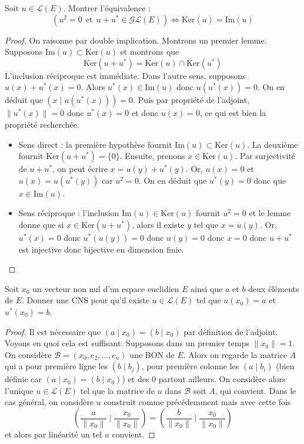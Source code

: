 \documentclass[french,a4paper]{article}
\newcommand{\st}{^*}
\renewcommand{\ker}{\text{Ker}}
\newcommand{\im}{\text{Im}}
\theoremstyle{plain}
\theoremstyle{definition}
\theoremstyle{remark}
\begin{document}
\begin{ex}{}
	Soit $u\in\mathcal{L}(E)$. Montrer l'équivalence : $$\left(u^2=0\ \ \text{et} \ \ u+u\st\in\mathcal{GL}(E)\right)\iff \ker(u)=\im(u)$$
\end{ex}
\begin{proof}
	On raisonne par double implication. Montrons un premier lemme. Supposons $\im(u)\subset\ker(u)$ et montrons que $$\ker(u+u\st)=\ker(u)\cap\ker(u\st)$$ L'inclusion réciproque est immédiate. Dans l'autre sens, supposons $u(x)+u\st(x)=0$. Alors $u\st(x)\in\im(u)$ donc $u(u\st(x))=0$. On en déduit que $(x\mid u(u\st(x)))=0$. Puis par propriété de l'adjoint, $\lVert u\st(x)\rVert=0$ donc $u\st(x)=0$ et donc $u(x)=0$, ce qui est bien la propriété recherchée.
	\begin{itemize}
		\item Sens direct : la première hypothèse fournit $\im(u)\subset\ker(u)$. La deuxième fournit $\ker(u+u\st)=\{0\}$. Ensuite, prenons $x\in\ker(u)$. Par surjectivité de $u+u\st$, on peut écrire $x=u(y)+u\st(y)$. Or, $u(x)=0$ et $u(x)=u(u\st(y))$ car $u^2=0$. On en déduit que $u\st(y)=0$ donc que $x\in\im(u)$. 
		\item Sens réciproque : l'inclusion $\im(u)\in\ker(u)$ fournit $u^2=0$ et le lemme donne que si $x\in\ker(u+u\st)$, alors il existe $y$ tel que $x=u(y)$. Or, $u\st(x)=0$ donc $u\st(u(y))=0$ donc $u(y)=0$ donc $x=0$ donc $u+u\st$ est injective donc bijective en dimension finie.
	\end{itemize}
\end{proof}

\begin{ex}{}
	Soit $x_0$ un vecteur non nul d'un espace euclidien $E$ ainsi que $a$ et $b$ deux éléments de $E$. Donner une CNS pour qu'il existe $u\in\mathcal{L}(E)$ tel que $u(x_0)=a$ et $u\st(x_0)=b$.
\end{ex}
\begin{proof}
	Il est nécessaire que $(a\mid x_0)=(b\mid x_0)$ par définition de l'adjoint. Voyons en quoi cela est suffisant. Supposons dans un premier temps $\lVert x_0\rVert=1$. On considère $\mathcal{B}=(x_0,e_2,\ldots,e_n)$ une BON de $E$. Alors on regarde la matrice $A$ qui a pour première ligne les $(b\mid b_j)$, pour première colonne les $(a\mid b_i)$ (bien définie car $(a\mid x_0)=(b\mid x_0)$) et des $0$ partout ailleurs. On considère alors l'unique $u\in\mathcal{L}(E)$ tel que la matrice de $u$ dans $\mathcal{B}$ soit $A$, qui convient. Dans le cas général, on considère $u$ construit comme précédemment mais avec cette fois $$\left(\frac{a}{\lVert x_0\rVert}\mid\frac{x_0}{\lVert x_0\rVert}\right)=\left(\frac{b}{\lVert x_0\rVert}\mid\frac{x_0}{\lVert x_0\rVert}\right)$$ et alors par linéarité un tel $u$ convient.
\end{proof}
\end{document}
